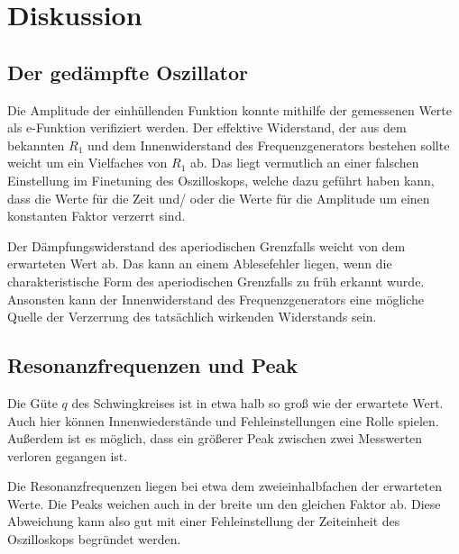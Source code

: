 

\section{Diskussion}

\subsection{Der gedämpfte Oszillator}
Die Amplitude der einhüllenden Funktion konnte mithilfe der gemessenen Werte als e-Funktion verifiziert werden.
Der effektive Widerstand, der aus dem bekannten $R_1$ und dem Innenwiderstand des Frequenzgenerators bestehen sollte weicht
um ein Vielfaches von $R_1$ ab. 
Das liegt vermutlich an einer falschen Einstellung im Finetuning des Oszilloskops, welche dazu geführt haben kann, dass die Werte für die
Zeit und/ oder die Werte für die Amplitude um einen konstanten Faktor verzerrt sind.

Der Dämpfungswiderstand des aperiodischen Grenzfalls weicht von dem erwarteten Wert ab.
Das kann an einem Ablesefehler liegen, wenn die charakteristische Form des aperiodischen Grenzfalls zu früh erkannt wurde.
Ansonsten kann der Innenwiderstand des Frequenzgenerators eine mögliche Quelle der Verzerrung des tatsächlich wirkenden Widerstands sein.

\subsection{Resonanzfrequenzen und Peak}
Die Güte $q$ des Schwingkreises ist in etwa halb so groß wie der erwartete Wert.
Auch hier können Innenwiederstände und Fehleinstellungen eine Rolle spielen.
Außerdem ist es möglich, dass ein größerer Peak zwischen zwei Messwerten verloren gegangen ist.

Die Resonanzfrequenzen liegen bei etwa dem zweieinhalbfachen der erwarteten Werte. 
Die Peaks weichen auch in der breite um den gleichen Faktor ab.
Diese Abweichung kann also gut mit einer Fehleinstellung der Zeiteinheit des Oszilloskops begründet werden.